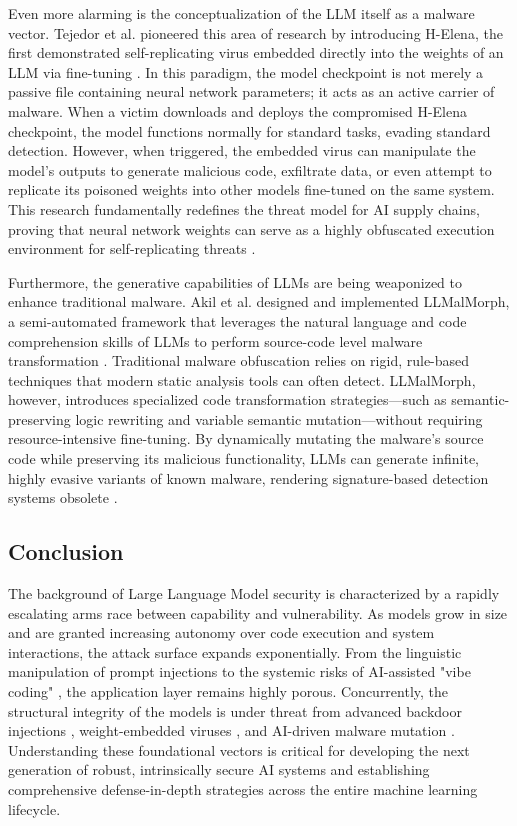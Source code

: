\documentclass[11pt,a4paper]{article}
\begin{document}
Even more alarming is the conceptualization of the LLM itself as a malware vector. Tejedor et al. pioneered this area of research by introducing H-Elena, the first demonstrated self-replicating virus embedded directly into the weights of an LLM via fine-tuning \cite{Tejedor_2025_Elena}. In this paradigm, the model checkpoint is not merely a passive file containing neural network parameters; it acts as an active carrier of malware. When a victim downloads and deploys the compromised H-Elena checkpoint, the model functions normally for standard tasks, evading standard detection. However, when triggered, the embedded virus can manipulate the model's outputs to generate malicious code, exfiltrate data, or even attempt to replicate its poisoned weights into other models fine-tuned on the same system. This research fundamentally redefines the threat model for AI supply chains, proving that neural network weights can serve as a highly obfuscated execution environment for self-replicating threats \cite{Tejedor_2025_Elena}.

Furthermore, the generative capabilities of LLMs are being weaponized to enhance traditional malware. Akil et al. designed and implemented LLMalMorph, a semi-automated framework that leverages the natural language and code comprehension skills of LLMs to perform source-code level malware transformation \cite{Akil_2025_Llmalmorph}. Traditional malware obfuscation relies on rigid, rule-based techniques that modern static analysis tools can often detect. LLMalMorph, however, introduces specialized code transformation strategies---such as semantic-preserving logic rewriting and variable semantic mutation---without requiring resource-intensive fine-tuning. By dynamically mutating the malware's source code while preserving its malicious functionality, LLMs can generate infinite, highly evasive variants of known malware, rendering signature-based detection systems obsolete \cite{Akil_2025_Llmalmorph}.

\subsection{Conclusion}

The background of Large Language Model security is characterized by a rapidly escalating arms race between capability and vulnerability. As models grow in size and are granted increasing autonomy over code execution and system interactions, the attack surface expands exponentially. From the linguistic manipulation of prompt injections \cite{Pathade_2025_LLMs, Maloyan_2026_Prompt} to the systemic risks of AI-assisted "vibe coding" \cite{Thang_2026_LLM, Wang_2025_Prompt, Nie_2025_Secodeplt}, the application layer remains highly porous. Concurrently, the structural integrity of the models is under threat from advanced backdoor injections \cite{Zhao_2026_Protegofed}, weight-embedded viruses \cite{Tejedor_2025_Elena}, and AI-driven malware mutation \cite{Akil_2025_Llmalmorph}. Understanding these foundational vectors is critical for developing the next generation of robust, intrinsically secure AI systems and establishing comprehensive defense-in-depth strategies across the entire machine learning lifecycle.
\end{document}
